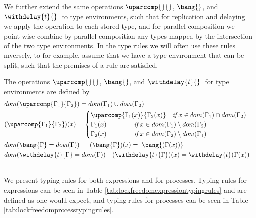 We further extend the same operations $\uparcomp{}{}$, $\bang{}$, and $\withdelay{t}{}\;$ to type environments, such that for replication and delaying we apply the operation to each stored type, and for parallel composition we point-wise combine by parallel composition any types mapped by the intersection of the two type environments. In the type rules we will often use these rules inversely, to for example, assume that we have a type environment that can be split, such that the premises of a rule are satisfied.

\begin{defi}
The operations $\uparcomp{}{}$, $\bang{}$, and $\withdelay{t}{}\;$ for type environments are defined by\\
\begin{align*}
        &dom(\uparcomp{\Gamma_1}{\Gamma_2}) = dom(\Gamma_1) \cup dom(\Gamma_2)\\
        &(\uparcomp{\Gamma_1}{\Gamma_2})(x) = 
        \begin{cases}
            \uparcomp{\Gamma_1(x)}{\Gamma_2(x)} \quad \textit{if}\;  x \in dom(\Gamma_1) \cap dom(\Gamma_2)\\
            \Gamma_1(x) \quad \quad \quad \quad\; \textit{if}\; x \in dom(\Gamma_1) \setminus dom(\Gamma_2)\\
            \Gamma_2(x) \quad \quad \quad \quad\; \textit{if}\; x \in dom(\Gamma_2) \setminus dom(\Gamma_1)
        \end{cases}\\
        &dom(\bang{\Gamma} = dom(\Gamma)) \quad\;\; (\bang{\Gamma})(x)=\;\bang{(\Gamma(x))} \\
        &dom(\withdelay{t}{\Gamma} = dom(\Gamma)) \quad (\withdelay{t}{\Gamma})(x) = \withdelay{t}(\Gamma(x))
    \end{align*}
    \begin{tabular}{ll}
        
    \end{tabular}
\label{def:lockfreeenvops}
\end{defi}

We present typing rules for both expressions and for processes. Typing rules for expressions can be seen in Table \ref{tab:lockfreedomexpressiontypingrules} and are defined as one would expect, and typing rules for processes can be seen in Table \ref{tab:lockfreedomprocesstypingrules}.

